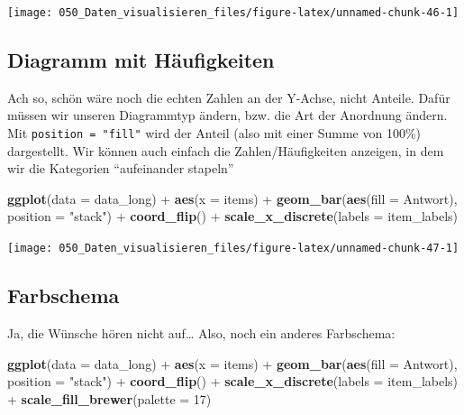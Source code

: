 \documentclass[12pt,]{book}
\newenvironment{Shaded}{\begin{snugshade}}{\end{snugshade}}
\newcommand{\KeywordTok}[1]{\textcolor[rgb]{0.13,0.29,0.53}{\textbf{{#1}}}}
\newcommand{\DataTypeTok}[1]{\textcolor[rgb]{0.13,0.29,0.53}{{#1}}}
\newcommand{\DecValTok}[1]{\textcolor[rgb]{0.00,0.00,0.81}{{#1}}}
\newcommand{\StringTok}[1]{\textcolor[rgb]{0.31,0.60,0.02}{{#1}}}
\newcommand{\NormalTok}[1]{{#1}}
\begin{document}
\begin{center}\texttt{[image: 050\_Daten\_visualisieren\_files/figure-latex/unnamed-chunk-46-1]} \end{center}

\subsection{Diagramm mit Häufigkeiten}\label{diagramm-mit-haufigkeiten}

Ach so, schön wäre noch die echten Zahlen an der Y-Achse, nicht Anteile.
Dafür müssen wir unseren Diagrammtyp ändern, bzw. die Art der Anordnung
ändern. Mit \texttt{position\ =\ "fill"} wird der Anteil (also mit einer
Summe von 100\%) dargestellt. Wir können auch einfach die
Zahlen/Häufigkeiten anzeigen, in dem wir die Kategorien ``aufeinander
stapeln''

\begin{Shaded}
\begin{Highlighting}[]
\KeywordTok{ggplot}\NormalTok{(}\DataTypeTok{data =} \NormalTok{data_long) +}
\StringTok{  }\KeywordTok{aes}\NormalTok{(}\DataTypeTok{x =} \NormalTok{items)  +}
\StringTok{  }\KeywordTok{geom_bar}\NormalTok{(}\KeywordTok{aes}\NormalTok{(}\DataTypeTok{fill =} \NormalTok{Antwort), }\DataTypeTok{position =} \StringTok{"stack"}\NormalTok{) +}
\StringTok{  }\KeywordTok{coord_flip}\NormalTok{() +}
\StringTok{  }\KeywordTok{scale_x_discrete}\NormalTok{(}\DataTypeTok{labels =} \NormalTok{item_labels) }
\end{Highlighting}
\end{Shaded}

\begin{center}\texttt{[image: 050\_Daten\_visualisieren\_files/figure-latex/unnamed-chunk-47-1]} \end{center}

\subsection{Farbschema}\label{farbschema}

Ja, die Wünsche hören nicht auf\ldots{} Also, noch ein anderes
Farbschema:

\begin{Shaded}
\begin{Highlighting}[]
\KeywordTok{ggplot}\NormalTok{(}\DataTypeTok{data =} \NormalTok{data_long) +}
\StringTok{  }\KeywordTok{aes}\NormalTok{(}\DataTypeTok{x =} \NormalTok{items)  +}
\StringTok{  }\KeywordTok{geom_bar}\NormalTok{(}\KeywordTok{aes}\NormalTok{(}\DataTypeTok{fill =} \NormalTok{Antwort), }\DataTypeTok{position =} \StringTok{"stack"}\NormalTok{) +}
\StringTok{  }\KeywordTok{coord_flip}\NormalTok{() +}
\StringTok{  }\KeywordTok{scale_x_discrete}\NormalTok{(}\DataTypeTok{labels =} \NormalTok{item_labels) +}
\StringTok{  }\KeywordTok{scale_fill_brewer}\NormalTok{(}\DataTypeTok{palette =} \DecValTok{17}\NormalTok{)}
\end{Highlighting}
\end{Shaded}
\end{document}
